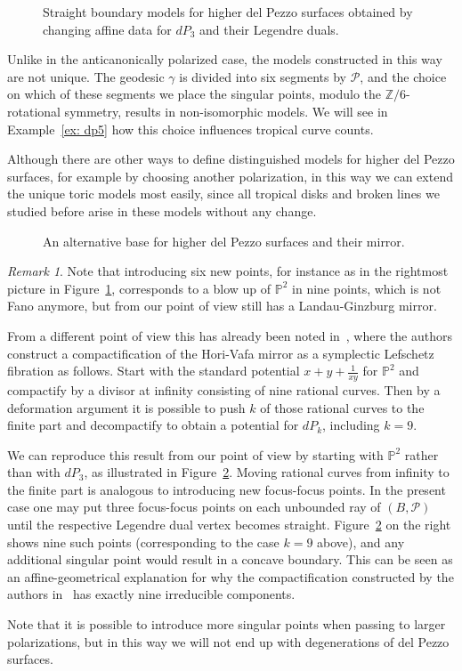 \documentclass[11pt,letter]{amsart}
\theoremstyle{definition}
\theoremstyle{remark}
\newtheorem{remark}[theorem]{Remark}
\numberwithin{equation}{section}
\numberwithin{figure}{section}
\newcommand{\ZZ} {\mathbb{Z}}
\newcommand{\PP} {\mathbb{P}}
\renewcommand{\P}  {\mathscr{P}}
\begin{document}
\begin{figure}

\caption{Straight boundary models for higher del Pezzo surfaces
obtained by changing affine data for $dP_3$ and their
Legendre duals.} 
\label{fig:nontoric_del_pezzo}
\end{figure}

Unlike in the anticanonically polarized case, the models constructed in this
way are not unique. The geodesic $\gamma$ is divided into six segments by $\P$,
and the choice on which of these segments we place the singular points, modulo
the $\ZZ/6$-rotational symmetry, results in non-isomorphic models. We will see
in Example~\ref{ex: dp5} how this choice influences tropical curve counts.

Although there are other ways to define distinguished models for higher del
Pezzo surfaces, for example by choosing another polarization, in this way we can
extend the unique toric models most easily, since all tropical disks and
broken lines we studied before arise in these models without any change.

\begin{figure} 

\caption{An alternative base for higher del Pezzo surfaces and their
mirror.}
\label{fig: AKO}
\end{figure}

\begin{remark}
Note that introducing six new points, for instance as in the rightmost picture
in Figure~\ref{fig:nontoric_del_pezzo}, corresponds to a blow up of $\PP^2$ in
nine points, which is not Fano anymore, but from our point of view still has a
Landau-Ginzburg mirror.

From a different point of view this has already been
noted in~\cite{AKO}, where the authors construct a compactification of the
Hori-Vafa mirror as a symplectic Lefschetz fibration as follows. Start with the
standard potential $x+y+\frac{1}{xy}$ for $\PP^2$ and compactify by a divisor at
infinity consisting of nine rational curves. Then by a deformation argument it
is possible to push $k$ of those rational curves to the finite part and
decompactify to obtain a potential for $dP_k$, including $k=9$.

We can reproduce this result from our point of view by starting with $\PP^2$
rather than with $dP_3$, as illustrated in Figure~\ref{fig: AKO}. Moving
rational curves from infinity to the finite part is analogous to introducing new
focus-focus points. In the present case one may put three focus-focus points on
each unbounded ray of $(B,\P)$ until the respective Legendre dual vertex becomes
straight. Figure~\ref{fig: AKO} on the right shows nine such points
(corresponding to the case $k=9$ above), and any additional singular point would
result in a concave boundary. This can be seen as an affine-geometrical
explanation for why the compactification constructed by the authors
in~\cite{AKO} has exactly nine irreducible components.

Note that it is possible to introduce more singular points when passing to
larger polarizations, but in this way we will not end up with degenerations of
del Pezzo surfaces.
\end{remark}
\end{document}

